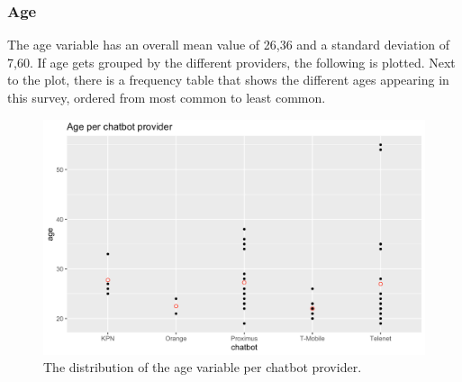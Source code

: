 \subsubsection{Age}
The age variable has an overall mean value of 26,36 and a standard deviation of 7,60. If age gets grouped by the different providers, the following is plotted. Next to the plot, there is a frequency table that shows the different ages appearing in this survey, ordered from most common to least common.
\begin{figure}[!htb]
	\includegraphics[width=\linewidth]{../LaTeX/Figures/Environments/AgePlot.png}
	\caption{The distribution of the age variable per chatbot provider.}\label{fig:agePlot}
	\endminipage\hfill

\end{figure}
